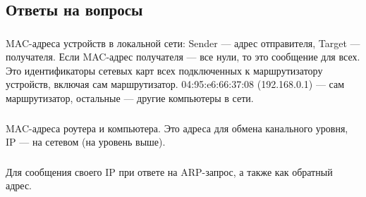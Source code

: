 \subsection{Ответы на вопросы}

\subsubsection{}
MAC-адреса устройств в локальной сети: Sender --- адрес отправителя, Target --- получателя.
Если MAC-адрес получателя --- все нули, то это сообщение для всех.
Это идентификаторы сетевых карт всех подключенных к маршрутизатору устройств, включая сам маршрутизатор.
04:95:e6:66:37:08 (192.168.0.1) --- сам маршрутизатор, остальные --- другие компьютеры в сети.

\subsubsection{}
MAC-адреса роутера и компьютера.
Это адреса для обмена канального уровня, IP --- на сетевом (на уровень выше).

\subsubsection{}
Для сообщения своего IP при ответе на ARP-запрос, а также как обратный адрес.
